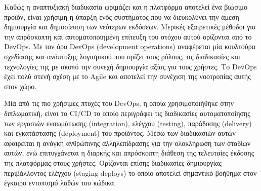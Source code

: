 Καθώς η αναπτυξιακή διαδικασία ωριμάζει και η πλατφόρμα αποτελεί ένα βιώσιμο προϊόν, είναι χρήσιμη η ύπαρξη ενός συστήματος που να διευκολύνει την άμεση δημιουργία και δημοσίευση των νεότερων εκδόσεων. Μερικές εξαιρετικές μέθοδοι για την απρόσκοπτη και αυτοματοποιημένη επίτευξη του στόχου αυτού ορίζονται από το DevOps. Με τον όρο DevOps (development operations) αναφέρεται μία κουλτούρα σχεδίασης και ανάπτυξης λογισμικού που ορίζει τους ρόλους, τις διαδικασίες και τεχνολογίες της με σκοπό την συνεχή δημιουργία αξίας για τους χρήστες. Το DevOps έχει πολύ στενή σχέση με το Agile και αποτελεί την συνέχιση της νοοτροπίας αυτής στον χώρο.

Μία από τις πιο χρήσιμες πτυχές του DevOps, η οποία χρησιμοποιήθηκε στην διπλωματική, είναι το CI/CD το οποίο περιγράφει τις διαδικασίες αυτοματοποίησης των εργασιών ενσωμάτωσης (integration), ελέγχου (testing), παράδοσης (delivery) και εγκατάστασης (deployment) του προϊόντος. Μέσω των διαδικασιών αυτών αφαιρείται η ανάγκη ανθρώπινης αλληλεπίδρασης για την ολοκλήρωση των σταδίων αυτών, ενώ επιτυγχάνεται η διαρκής και απρόσκοπτη διάθεση της τελευταίες έκδοσης της πλατφόρμας στους χρήστες. Ορίζονται επίσης διαδικασίες δημιουργίας περιβάλλοντος ελέγχου (staging deploys) το οποίο αποτελεί σημαντικό βοήθημα στον έγκαιρο εντοπισμό λαθών του κώδικα.
